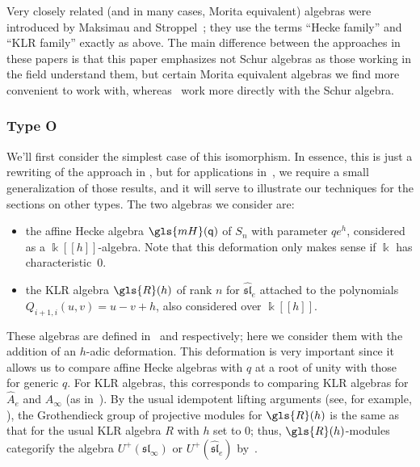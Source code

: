 \documentclass[ALCO,ThmDefs,Unicode,epreuves]{cedram}
\newcommand{\pq}{\mathsf{q}}
\newcommand{\slehat}{\mathfrak{\widehat{sl}}_e}
\newcommand{\K}{\Bbbk}%
\newcommand\llbracket{[\![}
\newcommand\rrbracket{]\!]}
\begin{document}
\begin{rema}
 Very closely related (and in many cases, Morita equivalent) algebras
 were introduced by Maksimau and Stroppel~\cite{MS18}; they use the
 terms ``Hecke family'' and ``KLR family'' exactly as above. The
 main difference between the approaches in these papers is that this
 paper emphasizes not Schur algebras as those working in the field
 understand them, but certain Morita equivalent algebras we find more
 convenient to work with, whereas~\cite{MS18} work more directly
 with the Schur algebra. 
\end{rema}

\subsubsection*{Type O} We'll first consider the simplest case of
this isomorphism. In essence, this is just a rewriting of the
approach in 
\cite[\S~3.2]{Rou2KM}, but for applications in~\cite{WebRou}, we require
a small generalization of those results, and it will serve to
illustrate our techniques for the sections on other types. The two algebras we consider are:
\begin{itemize}
\item the affine Hecke algebra $\gls{mH}(\pq)$ of
$S_n$ with parameter $qe^h$, considered as a $\K\llbracket h\rrbracket$-algebra. Note
that this deformation only makes sense if $\K$ has characteristic~0.
\item the KLR algebra $\gls{R}(h)$ of rank $n$ for
$\slehat$ attached to the polynomials $Q_{i+1,i}(u,v)=u-v+h$, also
considered over $\K\llbracket h\rrbracket$.
\end{itemize}
These algebras are defined in~\cite[(4.1--5)]{BKKL} and
\cite[(1.6--15)]{BKKL} respectively; here we consider them with
the addition of an $h$-adic deformation. This deformation is very
important since it allows us to compare affine Hecke algebras with $q$
at a root of unity with those for generic $q$. 
For KLR algebras, this
corresponds to comparing KLR algebras for $\widehat{A}_e$ and
$A_\infty$ (as in~\cite[Ex.~2.25]{WebwKLR}).
By the usual idempotent lifting arguments (see, for example,
\cite[Lem.~2.2]{Kbook}), the Grothendieck group of
projective modules for $\gls{R}(h)$ is the same as that for the usual KLR
algebra $R$ with $h$ set to $0$; thus, $\gls{R}(h)$-modules categorify the
algebra $U^+(\mathfrak{sl}_\infty)$ or
$U^+(\mathfrak{\widehat{sl}}_e)$ by~\cite[Thm.~8]{KLII}.
\end{document}

